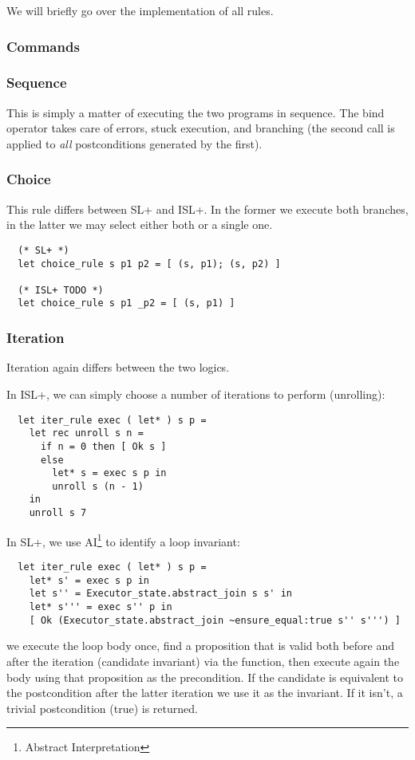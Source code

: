 \documentclass{scrartcl}
\begin{document}
We will briefly go over the implementation of all rules.

\subsubsection{Commands}



\subsubsection{Sequence}

This is simply a matter of executing the two programs in sequence. The bind operator takes care of errors, stuck execution, and branching (the second  call is applied to \emph{all} postconditions generated by the first).

\subsubsection{Choice}

This rule differs between SL+ and ISL+. In the former we execute both branches, in the latter we may select either both or a single one.

\begin{verbatim}
  (* SL+ *)
  let choice_rule s p1 p2 = [ (s, p1); (s, p2) ]

  (* ISL+ TODO *)
  let choice_rule s p1 _p2 = [ (s, p1) ]
\end{verbatim}

\subsubsection{Iteration}

Iteration again differs between the two logics.

In ISL+, we can simply choose a number of iterations to perform (unrolling):
\begin{verbatim}
  let iter_rule exec ( let* ) s p =
    let rec unroll s n =
      if n = 0 then [ Ok s ]
      else
        let* s = exec s p in
        unroll s (n - 1)
    in
    unroll s 7
\end{verbatim}

In SL+, we use AI\footnote{Abstract Interpretation} to identify a loop invariant:
\begin{verbatim}
  let iter_rule exec ( let* ) s p =
    let* s' = exec s p in
    let s'' = Executor_state.abstract_join s s' in
    let* s''' = exec s'' p in
    [ Ok (Executor_state.abstract_join ~ensure_equal:true s'' s''') ]
\end{verbatim}
we execute the loop body once, find a proposition that is valid both before and after the iteration (candidate invariant) via the  function, then execute again the body using that proposition as the precondition. If the candidate is equivalent to the postcondition after the latter iteration we use it as the invariant. If it isn't, a trivial postcondition (true) is returned.
\end{document}
